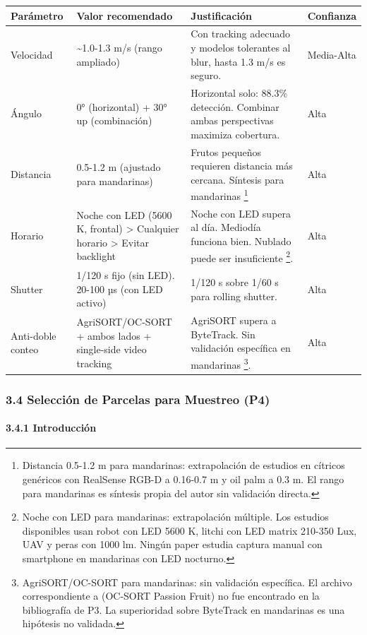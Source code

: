 \begin{tabular}{llll}
\hline
Parámetro & Valor recomendado & Justificación & Confianza \\
\hline
Velocidad & \textasciitilde{}1.0-1.3 m/s (rango ampliado) & Con tracking adecuado y modelos tolerantes al blur, hasta 1.3 m/s es seguro. & Media-Alta \\
Ángulo & 0° (horizontal) + 30° up (combinación) & Horizontal solo: 88.3\% detección. Combinar ambas perspectivas maximiza cobertura. & Alta \\
Distancia & 0.5-1.2 m (ajustado para mandarinas) & Frutos pequeños requieren distancia más cercana. Síntesis para mandarinas \footnote{Distancia 0.5-1.2 m para mandarinas: extrapolación de estudios en cítricos genéricos con RealSense RGB-D a 0.16-0.7 m y oil palm a 0.3 m. El rango para mandarinas es síntesis propia del autor sin validación directa.} & Alta \\
Horario & Noche con LED (5600 K, frontal) > Cualquier horario > Evitar backlight & Noche con LED supera al día. Mediodía funciona bien. Nublado puede ser insuficiente \footnote{Noche con LED para mandarinas: extrapolación múltiple. Los estudios disponibles usan robot con LED 5600 K, litchi con LED matrix 210-350 Lux, UAV y peras con 1000 lm. Ningún paper estudia captura manual con smartphone en mandarinas con LED nocturno.}. & Alta \\
Shutter & 1/120 s fijo (sin LED). 20-100 µs (con LED activo) & 1/120 s sobre 1/60 s para rolling shutter. & Alta \\
Anti-doble conteo & AgriSORT/OC-SORT + ambos lados + single-side video tracking & AgriSORT supera a ByteTrack. Sin validación específica en mandarinas \footnote{AgriSORT/OC-SORT para mandarinas: sin validación específica. El archivo correspondiente a (OC-SORT Passion Fruit) no fue encontrado en la bibliografía de P3. La superioridad sobre ByteTrack en mandarinas es una hipótesis no validada.}. & Alta \\
\hline
\end{tabular}



\subsubsection{3.4 Selección de Parcelas para Muestreo (P4)}


\paragraph{3.4.1 Introducción}


